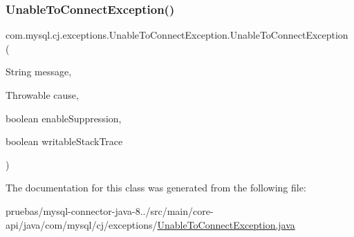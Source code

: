 \subsubsection{\texorpdfstring{Unable\+To\+Connect\+Exception()}{UnableToConnectException()}\hspace{0.1cm}{\footnotesize\ttfamily [5/5]}}
{\footnotesize\ttfamily com.\+mysql.\+cj.\+exceptions.\+Unable\+To\+Connect\+Exception.\+Unable\+To\+Connect\+Exception (\begin{DoxyParamCaption}\item[{String}]{message,  }\item[{Throwable}]{cause,  }\item[{boolean}]{enable\+Suppression,  }\item[{boolean}]{writable\+Stack\+Trace }\end{DoxyParamCaption})}



The documentation for this class was generated from the following file\+:\begin{DoxyCompactItemize}
\item 
pruebas/mysql-\/connector-\/java-\/8../src/main/core-\/api/java/com/mysql/cj/exceptions/\mbox{\hyperlink{_unable_to_connect_exception_8java}{Unable\+To\+Connect\+Exception.\+java}}\end{DoxyCompactItemize}
